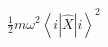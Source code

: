 \documentclass[preview]{standalone}
\begin{document}
\begin{center}
$\frac{1}{2}m\omega^2\left<i|\hat{X}|i\right>^2$
\end{center}
\end{document}
